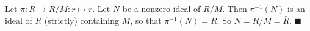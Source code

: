 Let $\pi : R \to R/M : r \mapsto \bar{r}$. Let $N$ be a nonzero ideal of $R/M$. Then $\pi^{-1}(N)$ is an ideal of $R$ (strictly) containing $M$, so that $\pi^{-1}(N)=R$. So $N= R/M = \bar{R}$. 
 $\blacksquare$